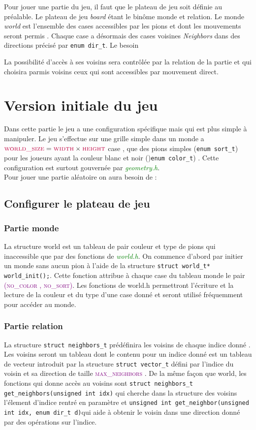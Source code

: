 \documentclass[a4paper]{article}
\begin{document}
Pour jouer une partie du jeu, il faut que le plateau de jeu soit définie au préalable. Le plateau de jeu \textit{board}  étant le binôme monde et relation. 
Le monde \textit{world} est l’ensemble des cases accessibles par les pions et dont les mouvements seront permis . Chaque case a désormais des cases voisines \textit{Neighbors} dans des directions précisé par \lstinline|enum dir_t|.
Le besoin 

La possibilité d’accès à ses voisins sera contrôlée par la relation de la partie et qui choisira parmis voisins ceux qui sont accessibles par mouvement direct.  
\section{Version initiale du jeu}
Dans cette partie le jeu a une configuration spécifique mais qui est plus simple à manipuler. Le jeu s’effectue sur une grille simple dans un monde a $\textcolor{purple}{\textsc{world\_size}} = \textcolor{purple}{\textsc{width}} \times \textcolor{purple}{\textsc{height}}$  case , que des pions simples (\lstinline|enum sort_t|) pour les joueurs ayant la couleur blanc et noir ()\lstinline|enum color_t|) . Cette configuration est surtout gouvernée par \textcolor{green}{\textit{geometry.h}}. \\
Pour jouer une partie aléatoire on aura besoin de :
\subsection{Configurer le plateau de jeu}
\subsubsection{Partie monde}
La structure world est un tableau de pair couleur et type de pions qui inaccessible que par des fonctions de \textcolor{green}{\textit{world.h}}. On commence d’abord par initier un monde sans aucun pion à l’aide de la structure \lstinline|struct world_t* world_init();|. Cette fonction attribue à chaque case du tableau monde le pair \textcolor{purple}{\textsc{(no\_color , no\_sort)}}. Les fonctions de world.h permettront l’écriture et la lecture de la couleur et du type d’une case donné et seront utilisé fréquemment pour accéder au monde.  

\subsubsection{Partie relation}
La structure \lstinline|struct neighbors_t| prédéfinira les voisins de chaque indice donné . Les voisins seront un tableau dont le contenu pour un indice donné est un tableau de vecteur introduit par la structure \lstinline|struct vector_t| défini par l’indice du voisin et sa direction de taille \textcolor{purple}{\textsc{max\_neighbors}} . De la même façon que world, les fonctions qui donne accès au voisins sont \lstinline|struct neighbors_t get_neighbors(unsigned int idx)| qui cherche dans la structure des voisins l’élement d’indice rentré en paramètre et \lstinline|unsigned int get_neighbor(unsigned int idx, enum dir_t d)|qui aide à obtenir le voisin dans une direction donné par des opérations sur l’indice.\\ 
\end{document}
